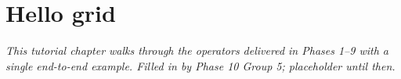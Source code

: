 \chapter{Hello grid}
\label{chap:hello-grid}

\textit{This tutorial chapter walks through the operators delivered in
Phases 1--9 with a single end-to-end example. Filled in by Phase 10
Group 5; placeholder until then.}
